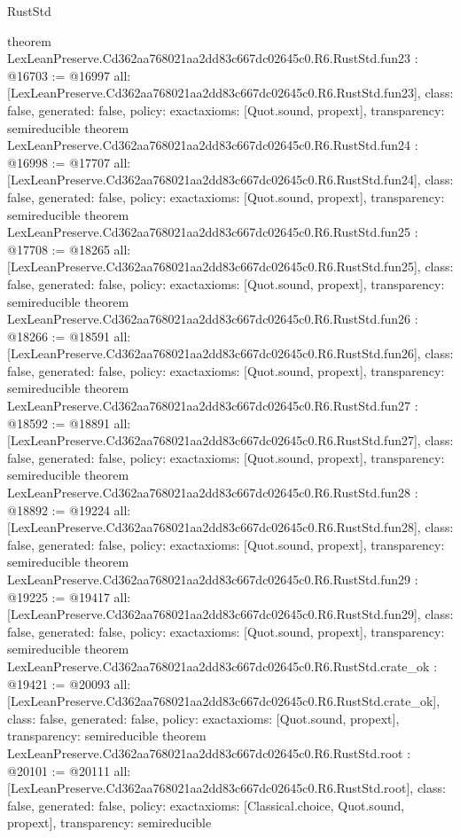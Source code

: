 \begin{lexlean}{RustStd}
\begin{coremodule}
{}
theorem LexLeanPreserve.Cd362aa768021aa2dd83c667dc02645c0.R6.RustStd.fun23 : @16703 := @16997 {
  all: [LexLeanPreserve.Cd362aa768021aa2dd83c667dc02645c0.R6.RustStd.fun23],
  class: false,
  generated: false,
  policy: exact{axioms: [Quot.sound, propext]},
  transparency: semireducible
}
theorem LexLeanPreserve.Cd362aa768021aa2dd83c667dc02645c0.R6.RustStd.fun24 : @16998 := @17707 {
  all: [LexLeanPreserve.Cd362aa768021aa2dd83c667dc02645c0.R6.RustStd.fun24],
  class: false,
  generated: false,
  policy: exact{axioms: [Quot.sound, propext]},
  transparency: semireducible
}
theorem LexLeanPreserve.Cd362aa768021aa2dd83c667dc02645c0.R6.RustStd.fun25 : @17708 := @18265 {
  all: [LexLeanPreserve.Cd362aa768021aa2dd83c667dc02645c0.R6.RustStd.fun25],
  class: false,
  generated: false,
  policy: exact{axioms: [Quot.sound, propext]},
  transparency: semireducible
}
theorem LexLeanPreserve.Cd362aa768021aa2dd83c667dc02645c0.R6.RustStd.fun26 : @18266 := @18591 {
  all: [LexLeanPreserve.Cd362aa768021aa2dd83c667dc02645c0.R6.RustStd.fun26],
  class: false,
  generated: false,
  policy: exact{axioms: [Quot.sound, propext]},
  transparency: semireducible
}
theorem LexLeanPreserve.Cd362aa768021aa2dd83c667dc02645c0.R6.RustStd.fun27 : @18592 := @18891 {
  all: [LexLeanPreserve.Cd362aa768021aa2dd83c667dc02645c0.R6.RustStd.fun27],
  class: false,
  generated: false,
  policy: exact{axioms: [Quot.sound, propext]},
  transparency: semireducible
}
theorem LexLeanPreserve.Cd362aa768021aa2dd83c667dc02645c0.R6.RustStd.fun28 : @18892 := @19224 {
  all: [LexLeanPreserve.Cd362aa768021aa2dd83c667dc02645c0.R6.RustStd.fun28],
  class: false,
  generated: false,
  policy: exact{axioms: [Quot.sound, propext]},
  transparency: semireducible
}
theorem LexLeanPreserve.Cd362aa768021aa2dd83c667dc02645c0.R6.RustStd.fun29 : @19225 := @19417 {
  all: [LexLeanPreserve.Cd362aa768021aa2dd83c667dc02645c0.R6.RustStd.fun29],
  class: false,
  generated: false,
  policy: exact{axioms: [Quot.sound, propext]},
  transparency: semireducible
}
theorem LexLeanPreserve.Cd362aa768021aa2dd83c667dc02645c0.R6.RustStd.crate_ok : @19421 := @20093 {
  all: [LexLeanPreserve.Cd362aa768021aa2dd83c667dc02645c0.R6.RustStd.crate_ok],
  class: false,
  generated: false,
  policy: exact{axioms: [Quot.sound, propext]},
  transparency: semireducible
}
theorem LexLeanPreserve.Cd362aa768021aa2dd83c667dc02645c0.R6.RustStd.root : @20101 := @20111 {
  all: [LexLeanPreserve.Cd362aa768021aa2dd83c667dc02645c0.R6.RustStd.root],
  class: false,
  generated: false,
  policy: exact{axioms: [Classical.choice, Quot.sound, propext]},
  transparency: semireducible
}


\end{coremodule}
\end{lexlean}
